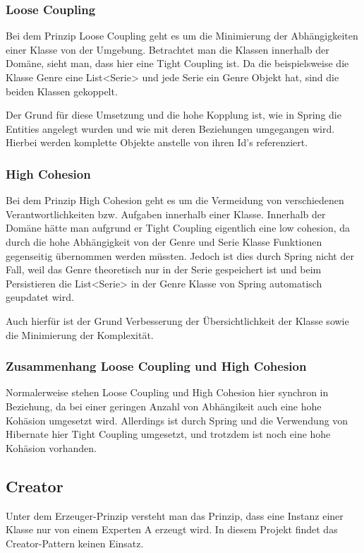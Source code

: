 		\subsubsection{Loose Coupling}
		
		Bei dem Prinzip Loose Coupling geht es um die Minimierung der Abhängigkeiten einer Klasse von der Umgebung. Betrachtet man die Klassen innerhalb der Domäne, sieht man, dass hier eine Tight Coupling ist. Da die beispielsweise die Klasse Genre eine List<Serie> und jede Serie ein Genre Objekt hat, sind die beiden Klassen gekoppelt. 
		
		Der Grund für diese Umsetzung und die hohe Kopplung ist, wie in Spring die Entities angelegt wurden und wie mit deren Beziehungen umgegangen wird. Hierbei werden komplette Objekte anstelle von ihren Id's referenziert.
		
		\subsubsection{High Cohesion}
		
		Bei dem Prinzip High Cohesion geht es um die Vermeidung von verschiedenen Verantwortlichkeiten bzw. Aufgaben innerhalb einer Klasse. Innerhalb der Domäne hätte man aufgrund er Tight Coupling eigentlich eine low cohesion, da durch die hohe Abhängigkeit von der Genre und Serie Klasse Funktionen gegenseitig übernommen werden müssten. Jedoch ist dies durch Spring nicht der Fall, weil das Genre theoretisch nur in der Serie gespeichert ist und beim Persistieren die List<Serie> in der Genre Klasse von Spring automatisch geupdatet wird.
		
		Auch hierfür ist der Grund Verbesserung der Übersichtlichkeit der Klasse sowie die Minimierung der Komplexität.
		
		\subsubsection{Zusammenhang Loose Coupling und High Cohesion}
		Normalerweise stehen Loose Coupling und High Cohesion  hier synchron in Beziehung, da bei einer geringen Anzahl von Abhängikeit auch eine hohe Kohäsion umgesetzt wird. Allerdings ist durch Spring und die Verwendung von Hibernate hier Tight Coupling umgesetzt, und trotzdem ist noch eine hohe Kohäsion vorhanden.

    \subsection{Creator}
    Unter dem Erzeuger-Prinzip versteht man das Prinzip, dass eine Instanz einer Klasse nur von einem Experten A erzeugt wird. In diesem Projekt findet das Creator-Pattern keinen Einsatz. 
    
